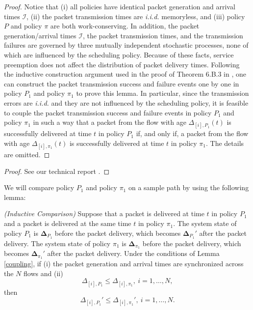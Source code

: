 \begin{proof}
Notice that (i) all policies have identical packet generation and arrival times $\mathcal{I}$, (ii) the packet transmission times are  \emph{i.i.d.} memoryless, and (iii) policy $P$ and policy $\pi$ are both work-conserving. In addition, the packet generation/arrival times $\mathcal I$, the packet transmission times, and the transmission failures are governed by three mutually independent stochastic processes, none of which are influenced by the scheduling policy. Because of these facts, service preemption does not affect the distribution of packet delivery times. Following the inductive construction argument used in the proof of Theorem 6.B.3 in \cite{StochasticOrderBook}, one can construct the packet transmission success and failure events one by one in policy $P_1$ and policy $\pi_1$ to prove this lemma. 
In particular, since the transmission errors are \emph{i.i.d.} and they are not influenced by the scheduling policy, it is feasible to couple the packet transmission success and failure events in policy $P_1$ and policy $\pi_1$ in such a way that a packet from the flow with age $\Delta_{[i],P_1}(t)$ is successfully delivered at time $t$ in policy $P_1$ if, and only if, a packet from the flow with age $\Delta_{[i],\pi_1}(t)$ is successfully delivered at time $t$ in policy $\pi_1$. The details are omitted. 
\end{proof}
\else
\begin{proof}
See our technical report \cite{SunMultiFlow18}.
\end{proof}
\fi

We will compare policy $P_1$ and policy $\pi_1$ on a sample path by using the following lemma: 

\begin{lemma} \emph{(Inductive Comparison)}\label{lem2}
Suppose that a packet is delivered at time $t$ in policy $P_1$ and a packet is delivered at the same time $t$ in policy $\pi_1$. The system state  of policy $P_1$ is $\bm\Delta_{P_1}$ before the packet delivery, which becomes $\bm\Delta_{P_1}'$ after the packet delivery. The system state  of policy $\pi_1$ is $\bm\Delta_{\pi_1}$ before the packet delivery, which becomes $\bm\Delta_{\pi_1}'$ after the packet delivery. Under the conditions of Lemma \ref{coupling}, if (i) the packet generation and arrival times are {synchronized} across the $N$ flows and (ii) 
\begin{equation}\label{hyp1}
\Delta_{[i],P_1} \leq \Delta_{[i],\pi_1},~i=1,\ldots,N,
\end{equation}
then
\begin{equation}\label{law6}
\Delta_{[i],P_1}' \leq \Delta_{[i],\pi_1}',~i=1,\ldots,N.
\end{equation}  
\end{lemma}


